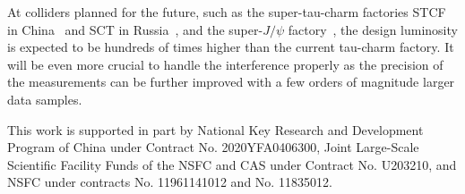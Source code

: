 \documentclass[%
preprint,
 amsmath,amssymb,
 aps,
]{revtex4-2}
\newcommand{\jpsi}{J/\psi}
\begin{document}
At colliders planned for the future, such as the super-tau-charm factories 
STCF in China~\cite{STCF} and SCT in Russia~\cite{SCT}, and the 
super-$\jpsi$ factory~\cite{super-jpsi}, the design luminosity is expected to be 
hundreds of times higher than the current tau-charm factory. 
It will be even more crucial to handle the interference properly as 
the precision of the measurements can be further improved with a few orders of
magnitude larger data samples. 

\acknowledgments

This work is supported in part by National Key Research and Development 
Program of China under Contract No. 2020YFA0406300, 
Joint Large-Scale Scientific Facility Funds 
of the NSFC and CAS under Contract No. U203210, 
and NSFC under contracts No. 11961141012 and No. 11835012.
\end{document}
